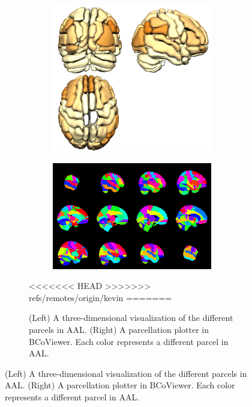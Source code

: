 \documentclass{nature}
\begin{document}
{\begin{figure}[tb]
\begin{figure}
\centering
\begin{subfigure}{.5\textwidth}
  \centering
  \includegraphics[width=.9\linewidth]{fig/brainconductor/AAL_all.png}
\end{subfigure}%
\begin{subfigure}{.5\textwidth}
  \centering
 
\includegraphics[width=.9\linewidth]{fig/brainconductor/partition_aal_sagittal_2016-04-11.png}
\end{subfigure}
\caption{(Left) A three-dimensional visualization of the different parcels in
AAL. (Right) A parcellation plotter in BCoViewer. Each color represents a
different parcel in AAL.}
\label{fig:aal}
<<<<<<< HEAD
>>>>>>> refs/remotes/origin/kevin
=======


\end{figure}
\end{figure}}
\end{document}
